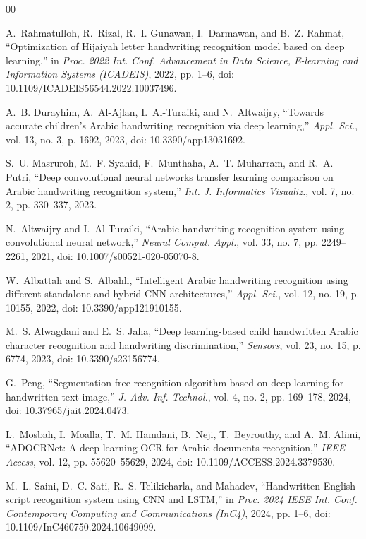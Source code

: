 \documentclass[conference]{IEEEtran}
\begin{document}
\begin{thebibliography}{00}

A.~Rahmatulloh, R.~Rizal, R.~I. Gunawan, I.~Darmawan, and B.~Z. Rahmat, ``Optimization of Hijaiyah letter handwriting recognition model based on deep learning,'' in \emph{Proc. 2022 Int. Conf. Advancement in Data Science, E-learning and Information Systems (ICADEIS)}, 2022, pp. 1--6, doi: 10.1109/ICADEIS56544.2022.10037496.

A.~B. Durayhim, A.~Al-Ajlan, I.~Al-Turaiki, and N.~Altwaijry, ``Towards accurate children's Arabic handwriting recognition via deep learning,'' \emph{Appl. Sci.}, vol. 13, no. 3, p. 1692, 2023, doi: 10.3390/app13031692.

S.~U. Masruroh, M.~F. Syahid, F.~Munthaha, A.~T. Muharram, and R.~A. Putri, ``Deep convolutional neural networks transfer learning comparison on Arabic handwriting recognition system,'' \emph{Int. J. Informatics Visualiz.}, vol. 7, no. 2, pp. 330--337, 2023.

N.~Altwaijry and I.~Al-Turaiki, ``Arabic handwriting recognition system using convolutional neural network,'' \emph{Neural Comput. Appl.}, vol. 33, no. 7, pp. 2249--2261, 2021, doi: 10.1007/s00521-020-05070-8.

W.~Albattah and S.~Albahli, ``Intelligent Arabic handwriting recognition using different standalone and hybrid CNN architectures,'' \emph{Appl. Sci.}, vol. 12, no. 19, p. 10155, 2022, doi: 10.3390/app121910155.

M.~S. Alwagdani and E.~S. Jaha, ``Deep learning-based child handwritten Arabic character recognition and handwriting discrimination,'' \emph{Sensors}, vol. 23, no. 15, p. 6774, 2023, doi: 10.3390/s23156774.

G.~Peng, ``Segmentation-free recognition algorithm based on deep learning for handwritten text image,'' \emph{J. Adv. Inf. Technol.}, vol. 4, no. 2, pp. 169--178, 2024, doi: 10.37965/jait.2024.0473.

L.~Mosbah, I.~Moalla, T.~M. Hamdani, B.~Neji, T.~Beyrouthy, and A.~M. Alimi, ``ADOCRNet: A deep learning OCR for Arabic documents recognition,'' \emph{IEEE Access}, vol. 12, pp. 55620--55629, 2024, doi: 10.1109/ACCESS.2024.3379530.

M.~L. Saini, D.~C. Sati, R.~S. Telikicharla, and Mahadev, ``Handwritten English script recognition system using CNN and LSTM,'' in \emph{Proc. 2024 IEEE Int. Conf. Contemporary Computing and Communications (InC4)}, 2024, pp. 1--6, doi: 10.1109/InC460750.2024.10649099.


\end{thebibliography}
\end{document}
